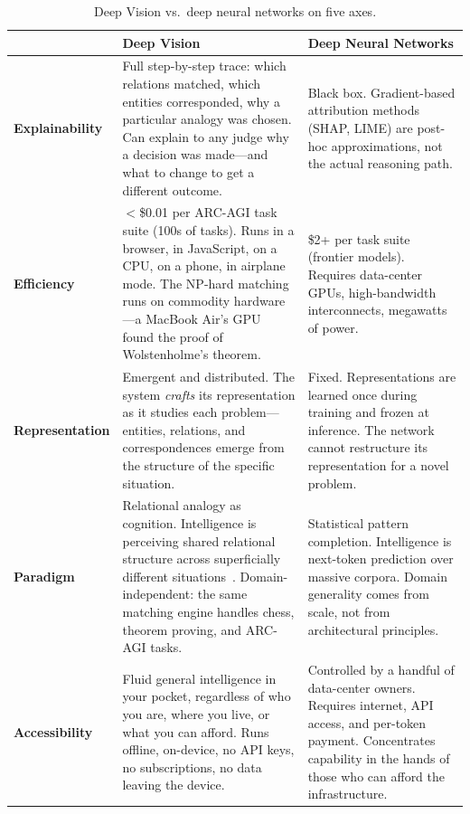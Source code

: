 \documentclass[11pt]{article}
\theoremstyle{definition}
\theoremstyle{remark}
\begin{document}
\begin{table}[h]
\centering
\small
\begin{tabular}{p{2.2cm}p{5.5cm}p{5.5cm}}
\toprule
& \textbf{Deep Vision} & \textbf{Deep Neural Networks} \\
\midrule
\textbf{Explain\-ability}
  & Full step-by-step trace: which relations matched, which entities corresponded, why a particular analogy was chosen.  Can explain to any judge why a decision was made---and what to change to get a different outcome.
  & Black box.  Gradient-based attribution methods (SHAP, LIME) are post-hoc approximations, not the actual reasoning path. \\[6pt]
\textbf{Efficiency}
  & $<$\$0.01 per ARC-AGI task suite (100s of tasks).  Runs in a browser, in JavaScript, on a CPU, on a phone, in airplane mode.  The NP-hard matching runs on commodity hardware---a MacBook Air's GPU found the proof of Wolstenholme's theorem.
  & \$2+ per task suite (frontier models).  Requires data-center GPUs, high-bandwidth interconnects, megawatts of power. \\[6pt]
\textbf{Repre\-sentation}
  & Emergent and distributed.  The system \emph{crafts} its representation as it studies each problem---entities, relations, and correspondences emerge from the structure of the specific situation.
  & Fixed.  Representations are learned once during training and frozen at inference.  The network cannot restructure its representation for a novel problem. \\[6pt]
\textbf{Paradigm}
  & Relational analogy as cognition.  Intelligence is perceiving shared relational structure across superficially different situations~\cite{hofstadter_fluid_1995}.  Domain-independent: the same matching engine handles chess, theorem proving, and ARC-AGI tasks.
  & Statistical pattern completion.  Intelligence is next-token prediction over massive corpora.  Domain generality comes from scale, not from architectural principles. \\[6pt]
\textbf{Access\-ibility}
  & Fluid general intelligence in your pocket, regardless of who you are, where you live, or what you can afford.  Runs offline, on-device, no API keys, no subscriptions, no data leaving the device.
  & Controlled by a handful of data-center owners.  Requires internet, API access, and per-token payment.  Concentrates capability in the hands of those who can afford the infrastructure. \\
\bottomrule
\end{tabular}
\caption{Deep Vision vs.\ deep neural networks on five axes.}
\label{tab:dv-vs-dnn}
\end{table}
\end{document}
